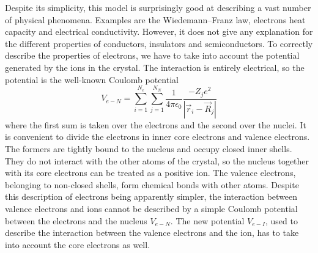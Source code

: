 Despite its simplicity, this model is surprisingly good at describing a vast number of physical phenomena. Examples are the Wiedemann–Franz law, electrons heat capacity and electrical conductivity. However, it does not give any explanation for the different properties of conductors, insulators and semiconductors. To correctly describe the properties of electrons, we have to take into account the potential generated by the ions in the crystal. The interaction is entirely electrical, so the potential is the well-known Coulomb potential
\begin{equation}
    V_{e-N} = \sum_{i=1}^{N_e} \sum_{j=1}^{N_N} \frac{1}{4\pi\epsilon_0} \frac{-Z_je^2}{|\vec{r}_i - \vec{R}_j|}
\end{equation}
where the first sum is taken over the electrons and the second over the nuclei. It is convenient to divide the electrons in inner core electrons and valence electrons. The formers are tightly bound to the nucleus and occupy closed inner shells. They do not interact with the other atoms of the crystal, so the nucleus together with its core electrons can be treated as a positive ion. The valence electrons, belonging to  non-closed shells, form chemical bonds with other atoms. Despite this description of electrons being apparently simpler, the interaction between valence electrons and ions cannot be described by a simple Coulomb potential between the electrons and the nucleus $V_{e-N}$. The new potential $V_{e-I}$, used to describe the interaction between the valence electrons and the ion, has to take into account the core electrons as well.

